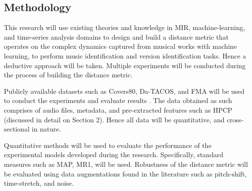 \documentclass[../main.tex]{subfiles}
\begin{document}
\subsection{Methodology}

\par
This research will use existing theories and knowledge in \gls{MIR}, machine-learning, and time-series analysis domains to design and build a distance metric that operates on the complex dynamics captured from musical works with machine learning, to perform music identification and version identification tasks. Hence a deductive approach will be taken. Multiple experiments will be conducted during the process of building the distance metric.

\par
Publicly available datasets such as Covers80, Da-TACOS, and FMA will be used to conduct the experiments and evaluate results \cite{Covers80CoverSong,yesilerDaTACOSDatasetCover2019,defferrardFMADatasetMusic2017}. The data obtained as such comprises of audio files, metadata, and pre-extracted features such as \gls{HPCP} (discussed in detail on Section 2). Hence all data will be quantitative, and cross-sectional in nature.

\par
Quantitative methods will be used to evaluate the performance of the experimental models developed during the research. Specifically, standard measures such as \gls{MAP}, \gls{MR1}, will be used. Robustness of the distance metric will be evaluated using data augmentations found in the literature such as pitch-shift, time-stretch, and noise.


\iffalse
\subsection{Significance of the Project}
\par
Music, being tightly coupled to the flow of time has complex dynamics which it is built upon. Current techniques available for music identification, and version identification do not consider this aspect of music. Therefore more work must be done in this area to explore the usability of this aspect of music to build music and version identification systems. 

\par
Furthermore, the dynamical properties have the potential to reveal patterns inherent to certain composers, genres, cultures, time periods etc. from musical works, which would act as a new basis to conduct more research in the \gls{MIR} domain.
\fi
\end{document}
